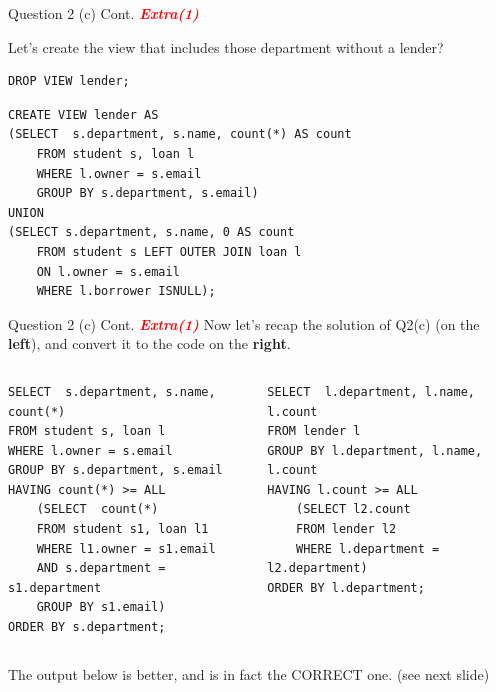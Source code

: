 \begin{frame}[fragile]{Question 2 (c) Cont. \textcolor{red}{\textit{\textbf{Extra(1)}}}}

Let's create the view that includes those department without a lender?
\begin{lstlisting}
DROP VIEW lender;
\end{lstlisting}
\begin{lstlisting}
CREATE VIEW lender AS
(SELECT  s.department, s.name, count(*) AS count
	FROM student s, loan l
	WHERE l.owner = s.email
	GROUP BY s.department, s.email)
UNION
(SELECT s.department, s.name, 0 AS count
	FROM student s LEFT OUTER JOIN loan l 
	ON l.owner = s.email
	WHERE l.borrower ISNULL);
\end{lstlisting}

\end{frame}

\begin{frame}[fragile]{Question 2 (c) Cont. \textcolor{red}{\textit{\textbf{Extra(1)}}}}
Now let's recap the solution of Q2(c) (on the \textbf{left}), and convert it to the code on the \textbf{right}.

\begin{columns}[t]
	
\begin{lstlisting}[style=sql-small]
SELECT  s.department, s.name, count(*)
FROM student s, loan l
WHERE l.owner = s.email
GROUP BY s.department, s.email
HAVING count(*) >= ALL
	(SELECT  count(*) 
	FROM student s1, loan l1
	WHERE l1.owner = s1.email
	AND s.department = s1.department
	GROUP BY s1.email)
ORDER BY s.department;
\end{lstlisting}

\begin{lstlisting}[style=sql-small]
SELECT  l.department, l.name, l.count
FROM lender l
GROUP BY l.department, l.name, l.count
HAVING l.count >= ALL
	(SELECT l2.count 
	FROM lender l2
	WHERE l.department = l2.department)
ORDER BY l.department;
\end{lstlisting}

\end{columns}

The output below is better, and is in fact the CORRECT one. (see next slide)

\end{frame}

